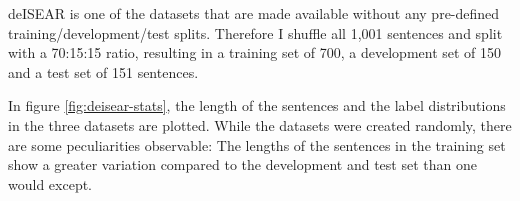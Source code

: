 


deISEAR is one of the datasets that are made available without any pre-defined
training/development/test splits. Therefore I shuffle all 1,001 sentences and
split with a 70:15:15 ratio, resulting in a training set of 700, a development
set of 150 and a test set of 151 sentences.

In figure \ref{fig:deisear-stats}, the length of the sentences and the label distributions in the three datasets are
plotted. While the datasets were created randomly, there are some peculiarities observable: The lengths of the sentences
in the training set show a greater variation compared to the development and test set than one would except.








